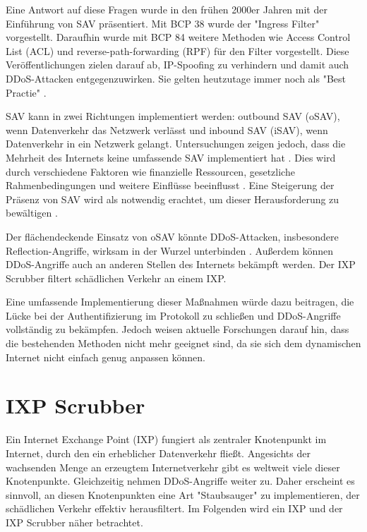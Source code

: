 \documentclass[sigplan,screen]{acmart}
\begin{document}
Eine Antwort auf diese Fragen wurde in den frühen 2000er Jahren mit der Einführung von SAV präsentiert. Mit BCP 38 \cite{Ingress01} wurde der "Ingress Filter" vorgestellt. Daraufhin wurde mit BCP 84 \cite{Bcp84} weitere Methoden wie Access Control List (ACL) und reverse-path-forwarding (RPF) für den Filter vorgestellt. Diese Veröffentlichungen zielen darauf ab, IP-Spoofing zu verhindern und damit auch DDoS-Attacken entgegenzuwirken. Sie gelten heutzutage immer noch als "Best Practie" \cite{Hal01}. 

SAV kann in zwei Richtungen implementiert werden: outbound SAV (oSAV), wenn Datenverkehr das Netzwerk verlässt und inbound SAV (iSAV), wenn Datenverkehr in ein Netzwerk gelangt. Untersuchungen zeigen jedoch, dass die Mehrheit des Internets keine umfassende SAV implementiert hat \cite{Spoofer01} \cite{CRP01}. Dies wird durch verschiedene Faktoren wie finanzielle Ressourcen, gesetzliche Rahmenbedingungen und weitere Einflüsse beeinflusst \cite{Hal01}. Eine Steigerung der Präsenz von SAV wird als notwendig erachtet, um dieser Herausforderung zu bewältigen \cite{manrs01}.

Der flächendeckende Einsatz von oSAV könnte DDoS-Attacken, insbesondere Reflection-Angriffe, wirksam in der Wurzel unterbinden \cite{FrontDoor01}. Außerdem können DDoS-Angriffe auch an anderen Stellen des Internets bekämpft werden. Der IXP Scrubber \cite{Hohlfeld01} filtert schädlichen Verkehr an einem IXP.

Eine umfassende Implementierung dieser Maßnahmen würde dazu beitragen, die Lücke bei der Authentifizierung im Protokoll zu schließen und DDoS-Angriffe vollständig zu bekämpfen. Jedoch weisen aktuelle Forschungen darauf hin, dass die bestehenden Methoden nicht mehr geeignet sind, da sie sich dem dynamischen Internet nicht einfach genug anpassen können.

\section{IXP Scrubber}
Ein Internet Exchange Point (IXP) fungiert als zentraler Knotenpunkt im Internet, durch den ein erheblicher Datenverkehr fließt. Angesichts der wachsenden Menge an erzeugtem Internetverkehr gibt es weltweit viele dieser Knotenpunkte. Gleichzeitig nehmen DDoS-Angriffe weiter zu. Daher erscheint es sinnvoll, an diesen Knotenpunkten eine Art "Staubsauger" zu implementieren, der schädlichen Verkehr effektiv herausfiltert. Im Folgenden wird ein IXP und der IXP Scrubber näher betrachtet.
\end{document}
